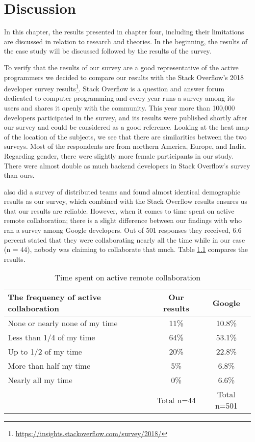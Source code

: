 \chapter{Discussion}

In this chapter, the results presented in chapter four, including their limitations are discussed in relation to research and theories. In the beginning, the results of the case study will be discussed followed by the results of the survey.

To verify that the results of our survey are a good representative of the active programmers we decided to compare our results with the Stack Overflow’s 2018 developer survey results\footnote{\url{https://insights.stackoverflow.com/survey/2018/}}. Stack Overflow is a question and answer forum dedicated to computer programming and every year runs a survey among its users and shares it openly with the community. This year more than 100,000 developers participated in the survey, and its results were published shortly after our survey and could be considered as a good reference. 
Looking at the heat map of the location of the subjects, we see that there are similarities between the two surveys. Most of the respondents are from northern America, Europe, and India. Regarding gender, there were slightly more female participants in our study. There were almost double as much backend developers in Stack Overflow’s survey than ours. 

\citet{Stray2017a} also did a survey of distributed teams and found almost identical demographic results as our survey, which combined with the Stack Overflow results ensures us that our results are reliable. 
However, when it comes to time spent on active remote collaboration; there is a slight difference between our findings with \citet{Karis2016} who ran a survey among Google developers. Out of 501 responses they received, 6.6 percent stated that they were collaborating nearly all the time while in our case (n = 44), nobody was claiming to collaborate that much. Table \ref{table:collaboration} compares the results.
    
    
\begin{table}
\centering
\caption{Time spent on active remote collaboration} \label{table:collaboration}
\begin{tabular}{lcc}
\hline
\textbf{The frequency of active collaboration} & \textbf{Our results} & \textbf{Google} \\ \hline
None or nearly none of my time&11\%&10.8\%\\
Less than 1/4 of my time&64\%&53.1\%\\
Up to 1/2 of my time&20\%&22.8\%\\
More than half my time&5\%&6.8\%\\
Nearly all my time&0\%&6.6\%\\
&Total n=44&Total n=501\\
\hline
\end{tabular}
\end{table}

